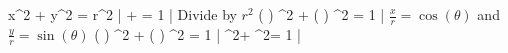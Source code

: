 x^2 + y^2 = r^2 |
 +  = 1 | Divide by $r^2$
\left(  \right) ^2 + \left(  \right) ^2   = 1 | $\frac{x}{r} = \cos(\theta)$ and $\frac{y}{r} = \sin(\theta)$
\left( \cos\theta ) ^2 + \left( \sin\theta \right) ^2   = 1 |
\cos^2\theta + \sin^2\theta = 1 | 
